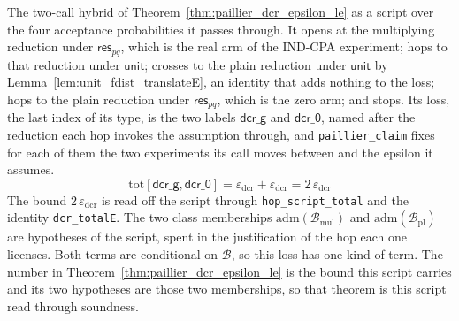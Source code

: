 \begin{definition}
  \label{def:paillier_script}
  \rocqok
  The two-call hybrid of Theorem~\ref{thm:paillier_dcr_epsilon_le} as a script
  over the four acceptance probabilities it passes through. It opens at the
  multiplying reduction under $\mathsf{res}_{pq}$, which is the real arm of the
  IND-CPA experiment; hops to that reduction under $\mathsf{unit}$; crosses to
  the plain reduction under $\mathsf{unit}$ by
  Lemma~\ref{lem:unit_fdist_translateE}, an identity that adds nothing to the
  loss; hops to the plain reduction under $\mathsf{res}_{pq}$, which is the
  zero arm; and stops. Its loss, the last index of its type, is the two labels
  $\mathsf{dcr\_g}$ and $\mathsf{dcr\_0}$, named after the reduction each hop
  invokes the assumption through, and \texttt{paillier\_claim} fixes for each
  of them the two experiments its call moves between and the epsilon it
  assumes.
  \[ \mathrm{tot}[\mathsf{dcr\_g}, \mathsf{dcr\_0}]
       = \varepsilon_{\mathrm{dcr}} + \varepsilon_{\mathrm{dcr}}
       = 2\,\varepsilon_{\mathrm{dcr}} \]
  The bound $2\,\varepsilon_{\mathrm{dcr}}$ is read off the script through
  \texttt{hop\_script\_total} and the identity \texttt{dcr\_totalE}. The two
  class memberships $\mathrm{adm}(\mathcal{B}_{\mathrm{mul}})$ and
  $\mathrm{adm}(\mathcal{B}_{\mathrm{pl}})$ are hypotheses of the script, spent
  in the justification of the hop each one licenses. Both terms are
  conditional on $\mathcal{B}$, so this loss has one kind of term. The number
  in Theorem~\ref{thm:paillier_dcr_epsilon_le} is the bound this script
  carries and its two hypotheses are those two memberships, so that theorem is
  this script read through soundness.
\end{definition}

